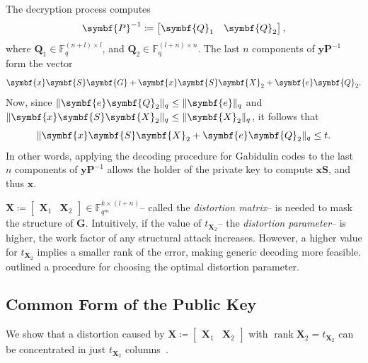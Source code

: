 \documentclass[version=last, paper=A4, parskip=half, oneside]{scrbook}
\theoremstyle{plain}
\theoremstyle{definition}
\theoremstyle{remark}
\renewcommand*{\vec}{\symbf}
\newcommand*{\mat}{\symbf}
\DeclareMathOperator{\rank}{rank}
\newcommand*{\FF}{\ensuremath{\mathbb{F}}}
\DeclarePairedDelimiter{\norm}{\lVert}{\rVert}
\newcommand*{\normR}[2]{\ensuremath{\norm{#1}_{#2}}}
\begin{document}
The decryption process computes
\[
  \mat{P}^{-1} \coloneqq
  \begin{bmatrix} \mat{Q}_1 & \mat{Q}_2 \end{bmatrix}\text,
\]
where \(\mat{Q}_1 \in \FF_q^{(n + l) \times l}\), and
\(\mat{Q}_2 \in \FF_q^{(l + n) \times n}\).  The last \(n\) components of
\(\vec{y} \mat{P}^{-1}\) form the vector
\[
  \vec{x} \mat{S} \mat{G} + \vec{x} \mat{S} \mat{X}_2 + \vec{e} \mat{Q}_2\text.
\]
Now, since \(\normR{\vec{e} \mat{Q}_2}{q} \le \normR{\vec{e}}{q}\) and
\(\normR{\vec{x} \mat{S} \mat{X}_2}{q} \le \normR{\mat{X}_2}{q}\), it follows
that
\[
  \normR{\vec{x} \mat{S} \mat{X}_2 + \vec{e} \mat{Q}_2}{q} \le t\text.
\]
In other words, applying the decoding procedure for Gabidulin codes to the last
\(n\) components of \(\vec{y} \mat{P}^{-1}\) allows the holder of the private
key to compute \(\vec{x} \mat{S}\), and thus \(\vec{x}\).

\(\mat{X} \coloneqq \begin{bmatrix} \mat{X}_1 & \mat{X}_2 \end{bmatrix} \in \FF_{q^m}^{k \times (l + n)}\)\---
called the \emph{distortion matrix}\--- is needed to mask the structure of
\(\mat{G}\).  Intuitively, if the value of \(t_{\mat{X}_2}\)\--- the
\emph{distortion parameter}\--- is higher, the work factor of any structural
attack increases.  However, a higher value for \(t_{\mat{X}_2}\) implies a
smaller rank of the error, making generic decoding more feasible.
\Textcite{GY05} outlined a procedure for choosing the optimal distortion
parameter.

\subsection{Common Form of the Public Key}

We show that a distortion caused by
\(\mat{X} \coloneqq \begin{bmatrix} \mat{X}_1 & \mat{X}_2 \end{bmatrix}\) with
\(\rank \mat{X}_2 = t_{\mat{X}_2}\) can be concentrated in just
\(t_{\mat{X}_2}\) columns~\cite{Ksh07}.
\end{document}
